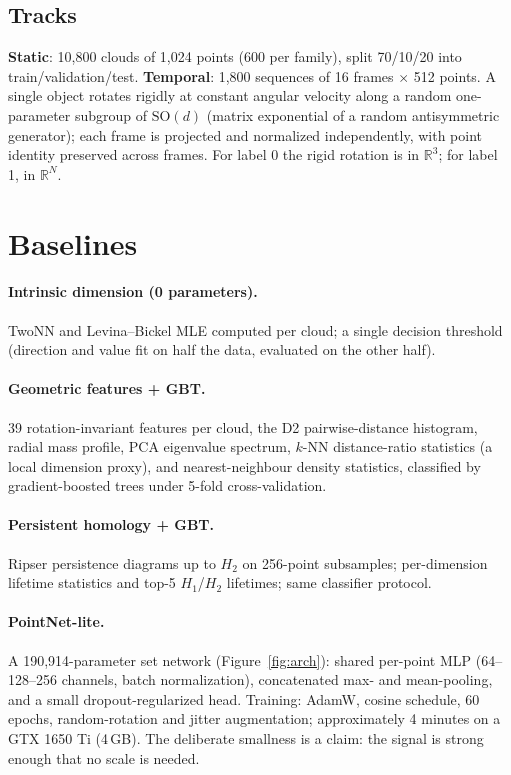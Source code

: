 \documentclass{article}
\begin{document}
\subsection{Tracks}

\textbf{Static}: 10{,}800 clouds of 1{,}024 points (600 per family), split 70/10/20 into train/validation/test. \textbf{Temporal}: 1{,}800 sequences of 16 frames $\times$ 512 points. A single object rotates rigidly at constant angular velocity along a random one-parameter subgroup of $\mathrm{SO}(d)$ (matrix exponential of a random antisymmetric generator); each frame is projected and normalized independently, with point identity preserved across frames. For label 0 the rigid rotation is in $\mathbb{R}^3$; for label 1, in $\mathbb{R}^N$.

\section{Baselines}
\label{sec:baselines}

\paragraph{Intrinsic dimension (0 parameters).} TwoNN \citep{facco2017twonn} and Levina--Bickel MLE \citep{levina2005mle} computed per cloud; a single decision threshold (direction and value fit on half the data, evaluated on the other half).

\paragraph{Geometric features + GBT.} 39 rotation-invariant features per cloud, the D2 pairwise-distance histogram, radial mass profile, PCA eigenvalue spectrum, $k$-NN distance-ratio statistics (a local dimension proxy), and nearest-neighbour density statistics, classified by gradient-boosted trees under 5-fold cross-validation.

\paragraph{Persistent homology + GBT.} Ripser \citep{tralie2018ripser} persistence diagrams up to $H_2$ on 256-point subsamples; per-dimension lifetime statistics and top-5 $H_1$/$H_2$ lifetimes; same classifier protocol.

\paragraph{PointNet-lite.} A 190{,}914-parameter set network (Figure~\ref{fig:arch}): shared per-point MLP (64--128--256 channels, batch normalization), concatenated max- and mean-pooling, and a small dropout-regularized head. Training: AdamW, cosine schedule, 60 epochs, random-rotation and jitter augmentation; approximately 4 minutes on a GTX 1650 Ti (4\,GB). The deliberate smallness is a claim: the signal is strong enough that no scale is needed.
\end{document}
